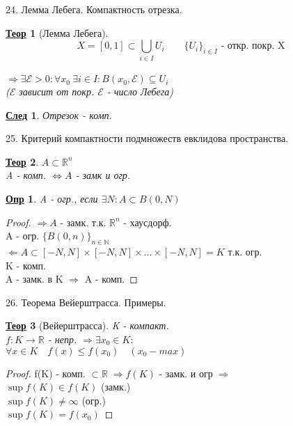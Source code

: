 \documentclass[12pt, fleqn]{article}
\newenvironment{question}[1]{\hspace*{-4em} #1}{\newpage}
\newcommand{\R}{\mathbb{R}}
\newcommand{\N}{\mathbb{N}}
\newcommand{\ra}{\Rightarrow}
\newcommand{\la}{\Leftarrow}
\newcommand{\rla}{\Leftrightarrow}
\newcommand{\q}{\quad}
\theoremstyle{nonumbermarginbreak}
\newtheorem{theorem}{\hspace*{-2em}\underline{\bfseries Теор}}[section]
\newtheorem{definition}{\hspace*{-2em}\underline{\bfseries Опр}}[section]
\newtheorem{proof}{\hspace*{-2em}\underline{\bfseries Док-во}}[section]
\newtheorem{consequence}{\hspace*{-2em}\underline{\bfseries След}}[section]
\begin{document}
    \begin{question}{24. Лемма Лебега. Компактность отрезка.}
        \begin{theorem} [Лемма Лебега] 
            \[X = [0, 1] \subset \bigcup_{i \in I} U_i \q\q \{U_i\}_{i \in I} \text{ - откр. покр. X}\]\\
            $\ra \exists \mathcal{E} > 0: \forall x_0 \ \exists i \in I: B(x_0, \mathcal{E}) \subseteq U_i$
            \\($\mathcal{E}$ зависит от покр. \q $\mathcal{E}$ - число Лебега)
        \end{theorem}

        \begin{consequence} 
            Отрезок - комп.
        \end{consequence}
    \end{question}

    \begin{question}{25. Критерий компактности подмножеств евклидова пространства.}
        \begin{theorem} 
            $A \subset \R^n$\\
            A - комп. $\rla A$ - замк и огр.
        \end{theorem}

        \begin{definition} 
            A - огр., если $\exists N: A \subset B(0, N)$
        \end{definition}

        \begin{proof} 
            $\ra A$ - замк. т.к. $\R^n$ - хаусдорф.\\
            A - огр. \q $\{B(0, n)\}_{n \in \N}$\\
            $\la A \subset [-N, N] \times [-N, N] \times ... \times [-N, N] = K$ т.к. огр.\\
            K - комп.\\
            A - замк. в K $\ra$ A - комп.
        \end{proof}
    \end{question}

    \begin{question}{26. Теорема Вейерштрасса. Примеры.}
        \begin{theorem} [Вейерштрасса] 
            K - компакт.\\
            $f: K \rightarrow \R $ - непр. $\ra \exists x_0 \in K:$\\
            $\forall x \in K \q f(x) \leq f(x_0) \q (x_0 - max)$
        \end{theorem}

        \begin{proof} 
            f(K) - комп. $\subset \R \; \ra f(K)$ - замк. и огр $\ra$\\
            $\sup{f(K)} \in f(K)$ (замк.)\\
            $\sup{f(K)} \neq \infty$ (огр.)\\
            $\sup{f(K)} = f(x_0)$
        \end{proof}
    \end{question}
\end{document}
